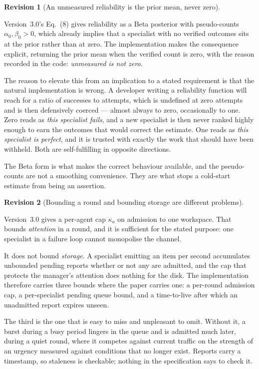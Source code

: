 \documentclass[11pt]{article}
\newtheorem{revision}{Revision}
\begin{document}
\begin{revision}[An unmeasured reliability is the prior mean, never zero]
\label{rev:prior}
\end{revision}

\noindent Version~3.0's Eq.~(8) gives reliability as a Beta posterior with pseudo-counts $\alpha_0,\beta_0>0$, which already implies that a specialist with no verified outcomes sits at the prior rather than at zero. The implementation makes the consequence explicit, returning the prior mean when the verified count is zero, with the reason recorded in the code: \emph{unmeasured is not zero}.

The reason to elevate this from an implication to a stated requirement is that the natural implementation is wrong. A developer writing a reliability function will reach for a ratio of successes to attempts, which is undefined at zero attempts and is then defensively coerced --- almost always to zero, occasionally to one. Zero reads as \emph{this specialist fails}, and a new specialist is then never ranked highly enough to earn the outcomes that would correct the estimate. One reads as \emph{this specialist is perfect}, and it is trusted with exactly the work that should have been withheld. Both are self-fulfilling in opposite directions.

The Beta form is what makes the correct behaviour available, and the pseudo-counts are not a smoothing convenience. They are what stops a cold-start estimate from being an assertion.

\begin{revision}[Bounding a round and bounding storage are different problems]
\label{rev:caps}
\end{revision}

\noindent Version~3.0 gives a per-agent cap $\kappa_a$ on admission to one workspace. That bounds \emph{attention} in a round, and it is sufficient for the stated purpose: one specialist in a failure loop cannot monopolise the channel.

It does not bound \emph{storage}. A specialist emitting an item per second accumulates unbounded pending reports whether or not any are admitted, and the cap that protects the manager's attention does nothing for the disk. The implementation therefore carries three bounds where the paper carries one: a per-round admission cap, a per-specialist pending queue bound, and a time-to-live after which an unadmitted report expires unseen.

The third is the one that is easy to miss and unpleasant to omit. Without it, a burst during a busy period lingers in the queue and is admitted much later, during a quiet round, where it competes against current traffic on the strength of an urgency measured against conditions that no longer exist. Reports carry a timestamp, so staleness is checkable; nothing in the specification says to check it.
\end{document}
